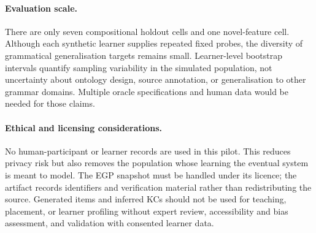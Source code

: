 \paragraph{Evaluation scale.}
There are only seven compositional holdout cells and one novel-feature cell.
Although each synthetic learner supplies repeated fixed probes, the diversity
of grammatical generalisation targets remains small.  Learner-level bootstrap
intervals quantify sampling variability in the simulated population, not
uncertainty about ontology design, source annotation, or generalisation to
other grammar domains.  Multiple oracle specifications and human data would
be needed for those claims.

\paragraph{Ethical and licensing considerations.}
No human-participant or learner records are used in this pilot.  This reduces
privacy risk but also removes the population whose learning the eventual
system is meant to model.  The EGP snapshot must be handled under its licence;
the artifact records identifiers and verification material rather than
redistributing the source.  Generated items and inferred KCs should not be
used for teaching, placement, or learner profiling without expert review,
accessibility and bias assessment, and validation with consented learner data.
